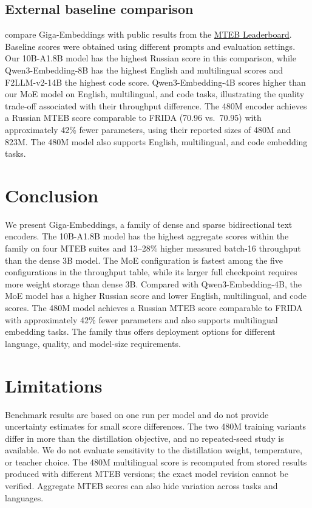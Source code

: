 \documentclass[11pt]{article}
\begin{document}
\subsection{External baseline comparison}

 compare Giga-Embeddings with public results from the \href{https://huggingface.co/spaces/mteb/leaderboard}{MTEB Leaderboard}.
Baseline scores were obtained using different prompts and evaluation settings.
Our 10B-A1.8B model has the highest Russian score in this comparison, while Qwen3-Embedding-8B has the highest English and multilingual scores and F2LLM-v2-14B the highest code score.
Qwen3-Embedding-4B scores higher than our MoE model on English, multilingual, and code tasks, illustrating the quality trade-off associated with their throughput difference.
The 480M encoder achieves a Russian MTEB score comparable to FRIDA (70.96 vs.\ 70.95) with approximately 42\% fewer parameters, using their reported sizes of 480M and 823M.
The 480M model also supports English, multilingual, and code embedding tasks.

\section{Conclusion}

We present Giga-Embeddings, a family of dense and sparse bidirectional text encoders.
The 10B-A1.8B model has the highest aggregate scores within the family on four MTEB suites and 13--28\% higher measured batch-16 throughput than the dense 3B model.
The MoE configuration is fastest among the five configurations in the throughput table, while its larger full checkpoint requires more weight storage than dense 3B.
Compared with Qwen3-Embedding-4B, the MoE model has a higher Russian score and lower English, multilingual, and code scores.
The 480M model achieves a Russian MTEB score comparable to FRIDA with approximately 42\% fewer parameters and also supports multilingual embedding tasks.
The family thus offers deployment options for different language, quality, and model-size requirements.

\section{Limitations}

Benchmark results are based on one run per model and do not provide uncertainty estimates for small score differences.
The two 480M training variants differ in more than the distillation objective, and no repeated-seed study is available.
We do not evaluate sensitivity to the distillation weight, temperature, or teacher choice.
The 480M multilingual score is recomputed from stored results produced with different MTEB versions; the exact model revision cannot be verified.
Aggregate MTEB scores can also hide variation across tasks and languages.
\end{document}
